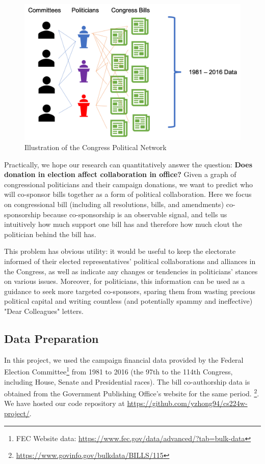 \documentclass[12pt,twocolumn]{article}
\begin{document}
\begin{figure}
\centering
\includegraphics[width=\linewidth]{network_illustration2}
\caption{Illustration of the Congress Political Network}
\label{fig_sim}
\end{figure}

Practically, we hope our research can quantitatively answer the question: \textbf{Does donation in election affect collaboration in office?} Given a graph of congressional politicians and their campaign donations, we want to predict who will co-sponsor bills together as a form of political collaboration. Here we focus on congressional bill (including all resolutions, bills, and amendments) co-sponsorship because co-sponsorship is an observable signal, and tells us intuitively how much support one bill has and therefore how much clout the politician behind the bill has. 

This problem has obvious utility: it would be useful to keep the electorate informed of their elected representatives' political collaborations and alliances in the Congress, as well as indicate any changes or tendencies in politicians' stances on various issues. Moreover, for politicians, this information can be used as a guidance to seek more targeted co-sponsors, sparing them from wasting precious political capital and writing countless (and potentially spammy and ineffective) "Dear Colleagues" letters. 

\subsection{Data Preparation}
In this project, we used the campaign financial data provided by the Federal Election Committee\footnote{FEC Website data: \url{https://www.fec.gov/data/advanced/?tab=bulk-data} } from 1981 to 2016 (the 97th to the 114th Congress, including House, Senate and Presidential races). The bill co-authorship data is obtained from the Government Publishing Office's website for the same period. \footnote{\url{https://www.govinfo.gov/bulkdata/BILLS/115}}.  We have hosted our code repository at \url{https://github.com/yzhong94/cs224w-project/}. 
\end{document}
